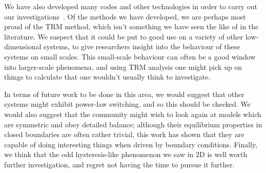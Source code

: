 We have also developed many codes and other technologies in order to carry out our investigations~\cite{hellier2019a, hellier2019b}. Of the methods we have developed, we are perhaps most proud of the TRM method, which
isn't something we have seen the like of in the literature. We suspect that it could be put to good use on a
variety of other low-dimensional systems, to give researchers insight into the behaviour of these systems on 
small scales. This small-scale behaviour can often be a good window into larger-scale phenomena, and using TRM
analysis one might pick up on things to calculate that one wouldn't usually think to investigate.

In terms of future work to be done in this area, we would suggest that other systems might exhibit
power-law switching, and so this should be checked. We would also suggest that the community
might wish to look again at models which are symmetric and obey detailed balance; although their
equilibrium properties in closed boundaries are often rather trivial, this work has shown that they are 
capable of doing interesting things when driven by boundary conditions. Finally, we think that the
odd hysteresis-like phenomenon we saw in $2$D is well worth further investigation, and regret not having the
time to pursue it further.



